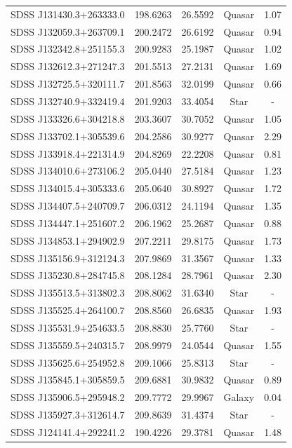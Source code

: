\begin{longtable}{c c c c c}
SDSS J131430.3$+$263333.0 & 198.6263 & 26.5592 & Quasar & 1.07 \\
SDSS J132059.3$+$263709.1 & 200.2472 & 26.6192 & Quasar & 0.94 \\
SDSS J132342.8$+$251155.3 & 200.9283 & 25.1987 & Quasar & 1.02 \\
SDSS J132612.3$+$271247.3 & 201.5513 & 27.2131 & Quasar & 1.69 \\
SDSS J132725.5$+$320111.7 & 201.8563 & 32.0199 & Quasar & 0.66 \\
SDSS J132740.9$+$332419.4 & 201.9203 & 33.4054 & Star & - \\
SDSS J133326.6$+$304218.8 & 203.3607 & 30.7052 & Quasar & 1.05 \\
SDSS J133702.1$+$305539.6 & 204.2586 & 30.9277 & Quasar & 2.29 \\
SDSS J133918.4$+$221314.9 & 204.8269 & 22.2208 & Quasar & 0.81 \\
SDSS J134010.6$+$273106.2 & 205.0440 & 27.5184 & Quasar & 1.23 \\
SDSS J134015.4$+$305333.6 & 205.0640 & 30.8927 & Quasar & 1.72 \\
SDSS J134407.5$+$240709.7 & 206.0312 & 24.1194 & Quasar & 1.35 \\
SDSS J134447.1$+$251607.2 & 206.1962 & 25.2687 & Quasar & 0.88 \\
SDSS J134853.1$+$294902.9 & 207.2211 & 29.8175 & Quasar & 1.73 \\
SDSS J135156.9$+$312124.3 & 207.9869 & 31.3567 & Quasar & 1.33 \\
SDSS J135230.8$+$284745.8 & 208.1284 & 28.7961 & Quasar & 2.30 \\
SDSS J135513.5$+$313802.3 & 208.8062 & 31.6340 & Star & - \\
SDSS J135525.4$+$264100.7 & 208.8560 & 26.6835 & Quasar & 1.93 \\
SDSS J135531.9$+$254633.5 & 208.8830 & 25.7760 & Star & - \\
SDSS J135559.5$+$240315.7 & 208.9979 & 24.0544 & Quasar & 1.55 \\
SDSS J135625.6$+$254952.8 & 209.1066 & 25.8313 & Star & - \\
SDSS J135845.1$+$305859.5 & 209.6881 & 30.9832 & Quasar & 0.89 \\
SDSS J135906.5$+$295948.2 & 209.7772 & 29.9967 & Galaxy & 0.04 \\
SDSS J135927.3$+$312614.7 & 209.8639 & 31.4374 & Star & - \\
SDSS J124141.4$+$292241.2 & 190.4226 & 29.3781 & Quasar & 1.48 \\

\end{longtable}
